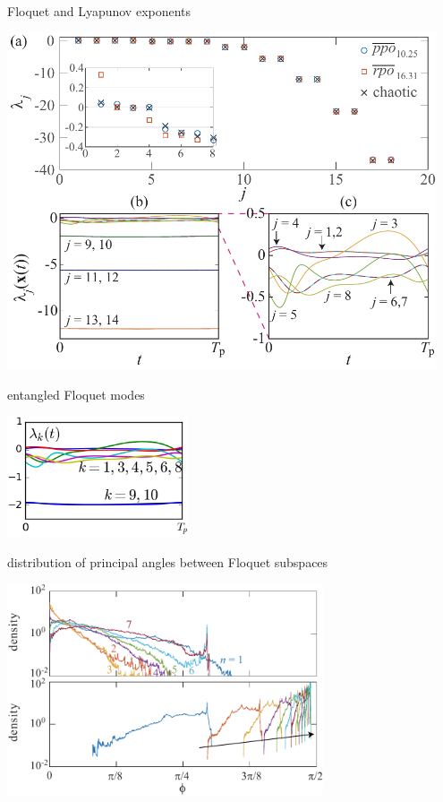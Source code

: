 \begin{frame}{Floquet and Lyapunov exponents}
\begin{center}
\includegraphics[width=0.95\textwidth]{../../dimension/ks22FloqExp}
\end{center}
\end{frame}

\begin{frame}{entangled Floquet modes}
\begin{center}
\includegraphics[width=0.4\textwidth]{../../xiong/figures/localFEppo1}
\end{center}
\end{frame}

\begin{frame}{distribution of principal angles between Floquet subspaces}
\begin{center}
\includegraphics[width=0.7\textwidth]{../../dimension/ks22vecAngles}
\end{center}
\end{frame}

